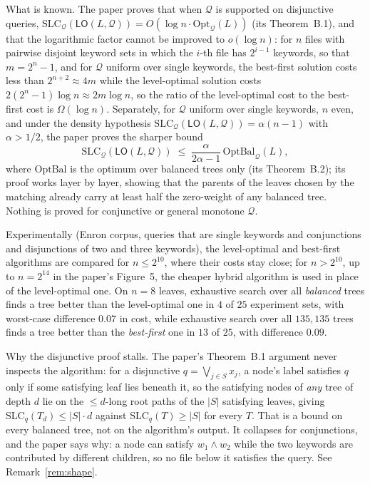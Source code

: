 \documentclass{aicr-conjecture}
\newcommand{\Qd}{\mathcal{Q}}
\newcommand{\SLC}{\mathrm{SLC}}
\newcommand{\Opt}{\mathrm{Opt}}
\newcommand{\OptBal}{\mathrm{OptBal}}
\newcommand{\LO}{\mathsf{LO}}
\begin{document}
What is known. The paper proves that when $\Qd$ is supported on disjunctive
queries, $\SLC_{\Qd}(\LO(L,\Qd)) = O(\log n \cdot \Opt_{\Qd}(L))$ (its
Theorem~B.1), and that the logarithmic factor cannot be improved to
$o(\log n)$: for $n$ files with pairwise disjoint keyword sets in which the
$i$-th file has $2^{i-1}$ keywords, so that $m = 2^{n} - 1$, and for $\Qd$
uniform over single keywords, the best-first solution costs less than
$2^{n+2} \approx 4m$ while the level-optimal solution costs
$2(2^{n}-1)\log n \approx 2m \log n$, so the ratio of the level-optimal
cost to the best-first cost is $\Omega(\log n)$. Separately, for $\Qd$
uniform over single keywords, $n$ even, and under the density hypothesis
$\SLC_{\Qd}(\LO(L,\Qd)) = \alpha(n-1)$ with $\alpha > 1/2$, the paper
proves the sharper bound
\[
  \SLC_{\Qd}(\LO(L,\Qd)) \;\le\;
  \frac{\alpha}{2\alpha-1}\,\OptBal_{\Qd}(L),
\]
where $\OptBal$ is the optimum over balanced trees only (its
Theorem~B.2); its proof works layer by layer, showing that the parents of
the leaves chosen by the matching already carry at least half the
zero-weight of any balanced tree. Nothing is proved for conjunctive or
general monotone $\Qd$.

Experimentally (Enron corpus, queries that are single keywords and
conjunctions and disjunctions of two and three keywords), the level-optimal
and best-first algorithms are compared for $n \le 2^{10}$, where their
costs stay close; for $n > 2^{10}$, up to $n = 2^{14}$ in the paper's
Figure~5, the cheaper hybrid algorithm is used in place of the
level-optimal one. On $n = 8$ leaves, exhaustive search over all
\emph{balanced} trees finds a tree better than the level-optimal one in $4$
of $25$ experiment sets, with worst-case difference $0.07$ in cost, while
exhaustive search over all $135{,}135$ trees finds a tree better than the
\emph{best-first} one in $13$ of $25$, with difference $0.09$.

Why the disjunctive proof stalls. The paper's Theorem~B.1 argument never
inspects the algorithm: for a disjunctive $q = \bigvee_{j \in S} x_j$, a
node's label satisfies $q$ only if some satisfying leaf lies beneath it, so
the satisfying nodes of \emph{any} tree of depth $d$ lie on the
$\le d$-long root paths of the $|S|$ satisfying leaves, giving
$\SLC_q(T_d) \le |S| \cdot d$ against $\SLC_q(T) \ge |S|$ for every $T$.
That is a bound on every balanced tree, not on the algorithm's output. It
collapses for conjunctions, and the paper says why: a node can satisfy
$w_1 \wedge w_2$ while the two keywords are contributed by different
children, so no file below it satisfies the query. See
Remark~\ref{rem:shape}.
\end{document}
